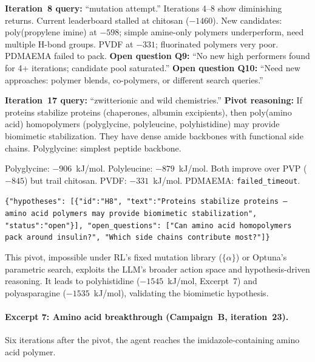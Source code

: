 \documentclass[twocolumn]{fairmeta}
\begin{document}
\begin{agentthought}
\scriptsize
\textbf{Iteration~8 query:} ``mutation attempt.''
Iterations 4--8 show diminishing returns.
Current leaderboard stalled at chitosan ($-1460$).
New candidates: poly(propylene imine) at $-598$; simple amine-only polymers underperform, need multiple H-bond groups.
PVDF at $-331$; fluorinated polymers very poor.
PDMAEMA failed to pack.
\textbf{Open question Q9:} ``No new high performers found for 4+ iterations; candidate pool saturated.''
\textbf{Open question Q10:} ``Need new approaches: polymer blends, co-polymers, or different search queries.''
\end{agentthought}

\begin{agentthought}
\scriptsize
\textbf{Iteration~17 query:} ``zwitterionic and wild chemistries.''
\textbf{Pivot reasoning:} If proteins stabilize proteins (chaperones, albumin excipients), then poly(amino acid) homopolymers (polyglycine, polyleucine, polyhistidine) may provide biomimetic stabilization.
They have dense amide backbones with functional side chains.
Polyglycine: simplest peptide backbone.
\end{agentthought}

\begin{toolcall}
\scriptsize
Polyglycine: $-906$~kJ/mol. Polyleucine: $-879$~kJ/mol.
Both improve over PVP ($-845$) but trail chitosan.
PVDF: $-331$~kJ/mol. PDMAEMA: \texttt{failed\_timeout}.
\end{toolcall}

\begin{toolcall}
\scriptsize
\texttt{\{"hypotheses": [\{"id":"H8", "text":"Proteins stabilize proteins -- amino acid polymers may provide biomimetic stabilization", "status":"open"\}], "open\_questions": ["Can amino acid homopolymers pack around insulin?", "Which side chains contribute most?"]\}}
\end{toolcall}

\noindent This pivot, impossible under RL's fixed mutation library ($\{\alpha\}$) or Optuna's parametric search, exploits the LLM's broader action space and hypothesis-driven reasoning.
It leads to polyhistidine ($-1545$~kJ/mol, Excerpt~7) and polyasparagine ($-1535$~kJ/mol), validating the biomimetic hypothesis.

\paragraph{Excerpt 7: Amino acid breakthrough (Campaign~B, iteration~23).}
Six iterations after the pivot, the agent reaches the imidazole-containing amino acid polymer.
\end{document}
